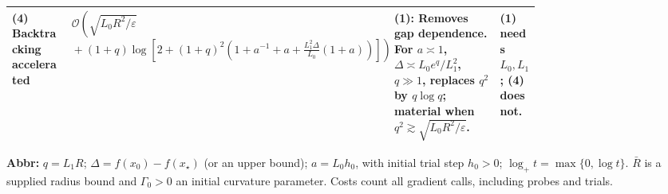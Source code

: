 \begin{table}[tp]
\begin{threeparttable}
\begin{tabularx}{\linewidth}{@{}>{\raggedright\arraybackslash}p{0.20\linewidth}>{\raggedright\arraybackslash}p{0.32\linewidth}>{\raggedright\arraybackslash}p{0.25\linewidth}>{\raggedright\arraybackslash}X@{}}
\midrule
\textbf{(4)} Backtracking accelerated \citep{radiusRepository} & $\mathcal{O}\!\left(\sqrt{L_0R^2/\varepsilon}\right.$\newline $\left.{}+(1+q)\log\!\left[2+(1+q)^2\left(1+a^{-1}+a+\frac{L_1^2\Delta}{L_0}(1+a)\right)\right]\right)$ & \textbf{(1)}: Removes gap dependence. For $a\asymp1$, $\Delta\asymp L_0e^q/L_1^2$, $q\gg1$, replaces $q^2$ by $q\log q$; material when $q^2\gtrsim\sqrt{L_0R^2/\varepsilon}$. & \textbf{(1)} needs $L_0,L_1$; \textbf{(4)} does not. \\
\bottomrule
\end{tabularx}
\begin{tablenotes}[flushleft]\footnotesize
\item[] \textbf{Abbr:} $q=L_1R$; $\Delta=f(x_0)-f(x_\star)$ (or an upper bound); $a=L_0h_0$, with initial trial step $h_0>0$; $\log_+t=\max\{0,\log t\}$. $\bar R$ is a supplied radius bound and $\Gamma_0>0$ an initial curvature parameter. Costs count all gradient calls, including probes and trials.
\end{tablenotes}
\end{threeparttable}
\end{table}
\clearpage
